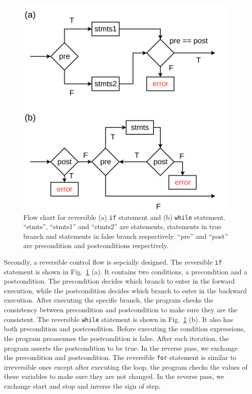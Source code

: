 \documentclass[aps,twocolumn,longbibliography,english,superscriptaddress]{revtex4-1}
\newcommand{\<}{\langle}
\renewcommand{\>}{\rangle}
\newcommand{\Fig}[1]{Fig.~\ref{#1}}
\theoremstyle{definition}\newtheorem{definition}{\textit{Definition}}
\begin{document}
\begin{figure}
    \centerline{\includegraphics[width=0.8\columnwidth,trim={0 0cm 0 0cm},clip]{images/controlflow.pdf}}
    \caption{Flow chart for reversible (a) \texttt{if} statement and (b) \texttt{while} statement. ``stmts'', ``stmts1'' and ``stmts2'' are statements, statements in true branch and statements in false branch respectively. ``pre'' and ``post'' are precondition and postconditions respectively.}\label{fig:controlflow}
\end{figure}
Secondly, a reversible control flow is sepcially designed.
The reversible \texttt{if} statement is shown in \Fig{fig:controlflow} (a). It contains two conditions, a precondition and a postcondition. The precondition decides which branch to enter in the forward execution, while the postcondition decides which branch to enter in the backward execution. After executing the specific branch, the program checks the consistency between precondition and postcondition to make sure they are the consistent.
The reversible \texttt{while} statement is shown in \Fig{fig:controlflow} (b). It also has both precondition and postcondition. Before executing the condition expressions, the program preassumes the postcondition is false.
After each iteration, the program asserts the postcondition to be true. In the reverse pass, we exchange the precondition and postcondition.
The reversible \texttt{for} statement is similar to irreversible ones except after executing the loop, the program checks the values of these variables to make sure they are not changed. In the reverse pass, we exchange start and stop and inverse the sign of step.
\end{document}

